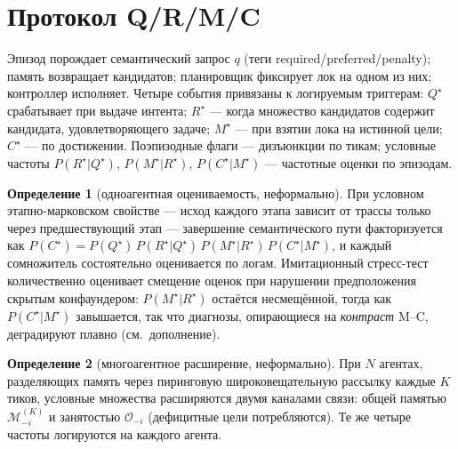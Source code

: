 \documentclass[letterpaper]{article} %
\begin{document}
\noindent{}

\section{Протокол Q/R/M/C}
\label{sec:protocol}

Эпизод порождает семантический запрос $q$ (теги
required/preferred/penalty); память возвращает кандидатов;
планировщик фиксирует лок на одном из них; контроллер исполняет.
Четыре события привязаны к логируемым триггерам: $Q^\star$
срабатывает при выдаче интента; $R^\star$ --- когда множество
кандидатов содержит кандидата, удовлетворяющего задаче; $M^\star$ ---
при взятии лока на истинной цели; $C^\star$ --- по достижении.
Поэпизодные флаги --- дизъюнкции по тикам; условные частоты
$P(R^\star|Q^\star)$, $P(M^\star|R^\star)$, $P(C^\star|M^\star)$ ---
частотные оценки по эпизодам.

\textbf{Определение 1} (одноагентная оцениваемость, неформально). При
условном этапно-марковском свойстве --- исход каждого этапа зависит
от трассы только через предшествующий этап --- завершение
семантического пути факторизуется как
$P(C^\star) = P(Q^\star)\,P(R^\star|Q^\star)\,P(M^\star|R^\star)\,
P(C^\star|M^\star)$, и каждый сомножитель состоятельно оценивается по
логам. Имитационный стресс-тест количественно оценивает смещение
оценок при нарушении предположения скрытым конфаундером:
$P(M^\star|R^\star)$ остаётся несмещённой, тогда как
$P(C^\star|M^\star)$ завышается, так что диагнозы, опирающиеся на
\emph{контраст} M--C, деградируют плавно (см.\ дополнение).

\textbf{Определение 2} (многоагентное расширение, неформально). При
$N$ агентах, разделяющих память через пиринговую широковещательную
рассылку каждые $K$ тиков, условные множества расширяются двумя
каналами связи: общей памятью $\mathcal{M}^{(K)}_{-i}$ и занятостью
$\mathcal{O}_{-i}$ (дефицитные цели потребляются). Те же четыре
частоты логируются на каждого агента.
\end{document}
